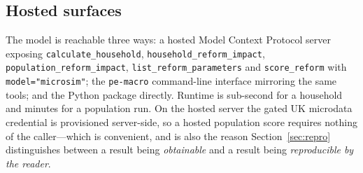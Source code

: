 \subsection{Hosted surfaces}

The model is reachable three ways: a hosted Model Context Protocol server exposing \texttt{calculate\_household}, \texttt{household\_reform\_impact}, \texttt{population\_reform\_impact}, \texttt{list\_reform\_parameters} and \texttt{score\_reform} with \texttt{model="microsim"}; the \texttt{pe-macro} command-line interface mirroring the same tools; and the Python package directly. Runtime is sub-second for a household and minutes for a population run. On the hosted server the gated UK microdata credential is provisioned server-side, so a hosted population score requires nothing of the caller---which is convenient, and is also the reason Section~\ref{sec:repro} distinguishes between a result being \emph{obtainable} and a result being \emph{reproducible by the reader}.
